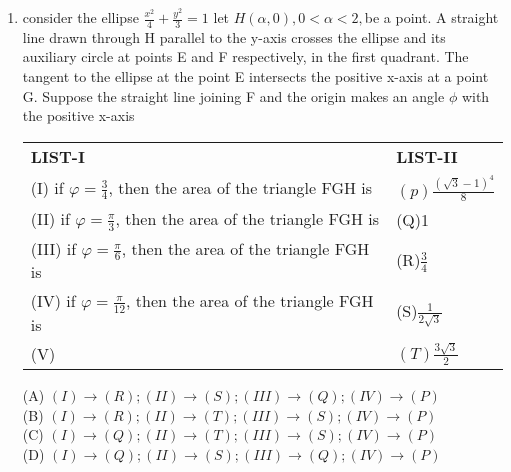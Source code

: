 \documentclass{article}
\begin{document}
\begin{enumerate}
			
(A) $(I)\to(T);(II)\to(R);(III)\to(S);(IV)\to(T)$\\   (B) $(I)\to(Q);(II)\to(S);(III)\to(S);(IV)\to(R)$\\   (C) $(I)\to(Q);(II)\to(R);(III)\to(P);(IV)\to(R)$\\   (D) $(I)\to(T);(II)\to(S);(III)\to(P);(IV)\to(T)$\\                             

	\item consider the ellipse $\frac{x^2}{4}+\frac{y^2}{3}=1$ let $H(\alpha,0),0<\alpha<2,$be a point. A straight line drawn through H parallel to the y-axis crosses the ellipse and its auxiliary circle at points E and F respectively, in the first quadrant. The tangent to the ellipse at the point E intersects the positive x-axis at a point G. Suppose the straight line joining F and the origin makes an angle $\phi$ with the positive x-axis\\                                                       \begin{center}                                                \begin{tabular}{l l}                                               \textbf{LIST-I} & \textbf{LIST-II} \\                               (I) if $\varphi=\frac{3}{4}$, then the area of the triangle FGH is & $(p)\frac{(\sqrt{3}-1)^4}{8}$\\                          (II) if $\varphi=\frac{\pi}{3}$, then the area of the triangle FGH is & (Q)1\\                                                (III) if $\varphi =\frac{\pi}{6}$, then the area of the triangle FGH is & (R)$\frac{3}{4}$\\                                  (IV) if $\varphi =\frac{\pi}{12}$, then the area of the triangle FGH is & (S)$\frac{1}{2\sqrt{3}}$\\                          (V)     & $(T)\frac{3\sqrt3}{2}$\\                             \end{tabular}                                          \end{center}                                                   (A) $(I) \to (R);(II) \to (S);(III) \to (Q);(IV) \to (P)$\\    (B) $(I) \to (R);(II) \to (T);(III) \to (S);(IV) \to (P)$ \\   (C) $(I) \to (Q);(II) \to (T);(III) \to (S);(IV) \to (P)$\\    (D) $(I) \to (Q);(II) \to (S);(III) \to (Q);(IV) \to (P)$\\    \medskip                                                       


\end{enumerate}
\end{document}
